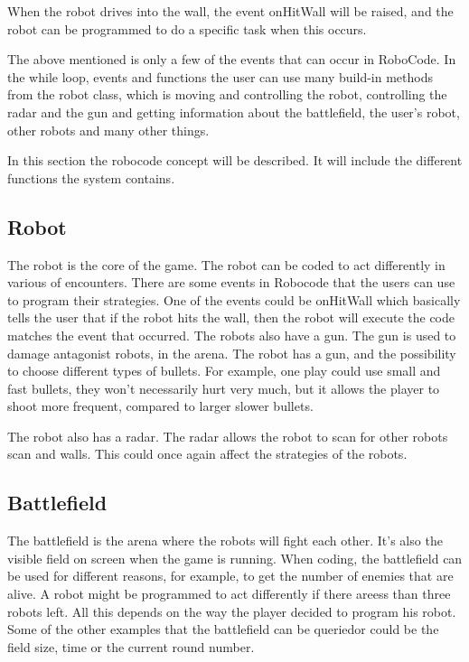 When the robot drives into the wall, the event onHitWall will be raised, and the robot can be programmed to do a specific task when this occurs. 

The above mentioned is only a few of the events that can occur in RoboCode. In the while loop, events and functions the user can use many build-in methods from the robot class, which is moving and controlling the robot, controlling the radar and the gun and getting information about the battlefield, the user's robot, other robots and many other things. 


In this section the robocode concept will be described. It will include the different functions the system contains.
  
\subsection{Robot}
The robot is the core of the game. The robot can be coded to act differently in various of encounters. There are some events in Robocode that the users can use to program their strategies. One of the events could be onHitWall which basically tells the user that if the robot hits the wall, then the robot will execute the code matches the event that occurred. The robots also have a gun. The gun is used to damage antagonist robots, in the arena. The robot has a gun, and the possibility to choose different types of bullets. For example, one play could use small and fast bullets, they won’t necessarily hurt very much, but it allows the player to shoot more frequent, compared to larger slower bullets. 

The robot also has a radar. The radar allows the robot to scan for other robots scan and walls. This could once again affect the strategies of the robots.

\subsection{Battlefield}
The battlefield is the arena where the robots will fight each other. It’s also the visible field on screen when the game is running. When coding, the battlefield can be used for different reasons, for example, to get the number of enemies that are alive. A robot might be programmed to act differently if there areess than three robots left. All this depends on the way the player decided to program his robot. Some of the other examples that the battlefield can be queriedor could be the field size, time or the current round number. 


